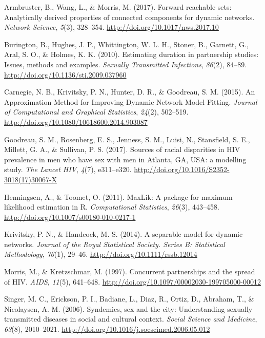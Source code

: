 \documentclass [11pt, proquest] {uwthesis}[2015/03/03]
\begin{document}

\noindent

\setlength{\parindent}{-0.20in} \setlength{\leftskip}{0.20in}
\setlength{\parskip}{8pt}

\hypertarget{refs}{}
\hypertarget{ref-Armbruster2017}{}
Armbruster, B., Wang, L., \& Morris, M. (2017). Forward reachable sets:
Analytically derived properties of connected components for dynamic
networks. \emph{Network Science}, \emph{5}(3), 328--354.
\url{http://doi.org/10.1017/nws.2017.10}

\hypertarget{ref-Burington2010}{}
Burington, B., Hughes, J. P., Whittington, W. L. H., Stoner, B.,
Garnett, G., Aral, S. O., \& Holmes, K. K. (2010). Estimating duration
in partnership studies: Issues, methods and examples. \emph{Sexually
Transmitted Infections}, \emph{86}(2), 84--89.
\url{http://doi.org/10.1136/sti.2009.037960}

\hypertarget{ref-Carnegie2015}{}
Carnegie, N. B., Krivitsky, P. N., Hunter, D. R., \& Goodreau, S. M.
(2015). An Approximation Method for Improving Dynamic Network Model
Fitting. \emph{Journal of Computational and Graphical Statistics},
\emph{24}(2), 502--519.
\url{http://doi.org/10.1080/10618600.2014.903087}

\hypertarget{ref-Goodreau2017}{}
Goodreau, S. M., Rosenberg, E. S., Jenness, S. M., Luisi, N.,
Stansfield, S. E., Millett, G. A., \& Sullivan, P. S. (2017). Sources of
racial disparities in HIV prevalence in men who have sex with men in
Atlanta, GA, USA: a modelling study. \emph{The Lancet HIV}, \emph{4}(7),
e311--e320. \url{http://doi.org/10.1016/S2352-3018(17)30067-X}

\hypertarget{ref-Henningsen2011}{}
Henningsen, A., \& Toomet, O. (2011). MaxLik: A package for maximum
likelihood estimation in R. \emph{Computational Statistics},
\emph{26}(3), 443--458. \url{http://doi.org/10.1007/s00180-010-0217-1}

\hypertarget{ref-Krivitsky2014}{}
Krivitsky, P. N., \& Handcock, M. S. (2014). A separable model for
dynamic networks. \emph{Journal of the Royal Statistical Society. Series
B: Statistical Methodology}, \emph{76}(1), 29--46.
\url{http://doi.org/10.1111/rssb.12014}

\hypertarget{ref-Morris1997}{}
Morris, M., \& Kretzschmar, M. (1997). Concurrent partnerships and the
spread of HIV. \emph{AIDS}, \emph{11}(5), 641--648.
\url{http://doi.org/10.1097/00002030-199705000-00012}

\hypertarget{ref-Singer2006}{}
Singer, M. C., Erickson, P. I., Badiane, L., Diaz, R., Ortiz, D.,
Abraham, T., \& Nicolaysen, A. M. (2006). Syndemics, sex and the city:
Understanding sexually transmitted diseases in social and cultural
context. \emph{Social Science and Medicine}, \emph{63}(8), 2010--2021.
\url{http://doi.org/10.1016/j.socscimed.2006.05.012}
\end{document}

